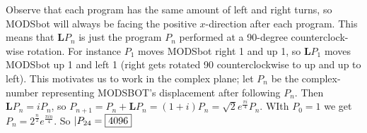 \begin{solution}\hfil\medskip
        
    Observe that each program has the same amount of left and right turns, so MODSbot will always be facing the positive \(x\)-direction after each program.
	This means that \(\textbf{L}P_n\) is just the program \(P_n\) performed at a 90-degree counterclock-wise rotation.
	For instance \(P_1\) moves MODSbot right 1 and up 1, so \(\textbf{L}P_1\) moves MODSbot up 1 and left 1 (right gets rotated 90 counterclockwise to up and up to left).
	This motivates us to work in the complex plane; let \(P_n\) be the complex-number representing MODSBOT's displacement after following \(P_n\).
	Then \(\textbf{L}P_n=iP_n\), so \(P_{n+1}=P_n+\textbf{L}P_n=(1+i)P_n=\sqrt{2}e^{\frac{\pi i}{4}}P_n\).
	WIth \(P_0=1\) we get \(P_n=2^{\frac{n}{2}}e^\frac{\pi i n}{4}\). 
	So \(|P_{24}=\fbox{4096}\)
\end{solution}\bigskip